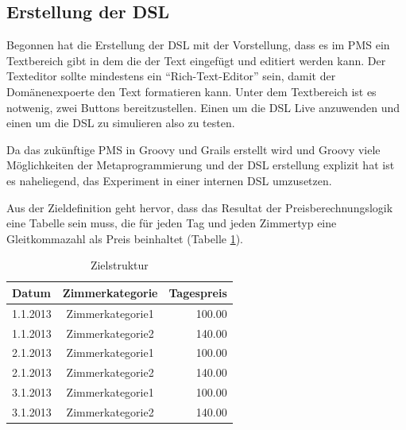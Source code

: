 \documentclass[11pt,english,ngerman, headsepline]{scrreprt}
\begin{document}
\subsection{Erstellung der DSL}
Begonnen hat die Erstellung der DSL mit der Vorstellung, dass es im PMS ein
Textbereich gibt in dem die der Text eingefügt und editiert werden kann.
Der Texteditor sollte mindestens ein ``Rich-Text-Editor'' sein, damit der
Domänenexpoerte den Text formatieren kann.
Unter dem Textbereich ist es notwenig, zwei Buttons bereitzustellen. Einen um
die DSL Live anzuwenden und einen um die DSL zu simulieren also zu testen.

Da das zukünftige PMS in Groovy und Grails erstellt wird und Groovy viele
Möglichkeiten der Metaprogrammierung und der DSL erstellung explizit hat ist es
naheliegend, das Experiment in einer internen DSL umzusetzen. 

Aus der Zieldefinition geht hervor, dass das Resultat der Preisberechnungslogik
eine Tabelle sein muss, die für jeden Tag und jeden Zimmertyp eine Gleitkommazahl als
Preis beinhaltet (Tabelle \ref{zielDefinition}).  

\begin{table}[htpb]
  \centering
  \begin{tabular}{| l | c | r |} 
 	\hline 
  	Datum & Zimmerkategorie & Tagespreis \\
  	\hline 
	1.1.2013 &  Zimmerkategorie1 &  100.00 \\
	1.1.2013 &  Zimmerkategorie2 &  140.00 \\
	2.1.2013 &  Zimmerkategorie1 &  100.00 \\
	2.1.2013 &  Zimmerkategorie2 &  140.00 \\
	3.1.2013 &  Zimmerkategorie1 &  100.00 \\
	3.1.2013 &  Zimmerkategorie2 &  140.00 \\
	\hline 
  	\end{tabular}  
 	\caption{Zielstruktur}
  \label{zielDefinition}
\end{table}	 
\end{document}

